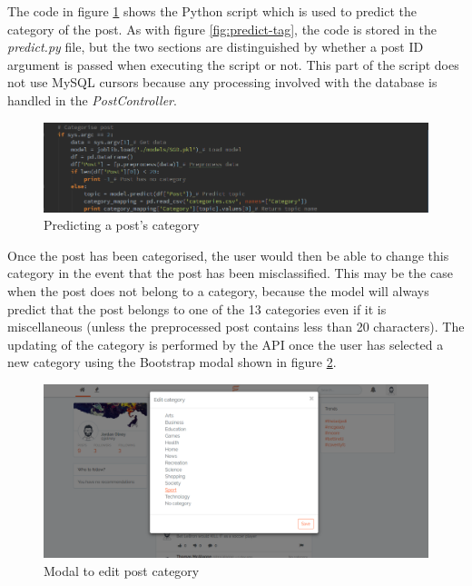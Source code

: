 The code in figure \ref{fig:predict-post} shows the Python script which is used to predict the category of the post. As with figure \ref{fig:predict-tag}, the code is stored in the \emph{predict.py} file, but the two sections are distinguished by whether a post ID argument is passed when executing the script or not. This part of the script does not use MySQL cursors because any processing involved with the database is handled in the \emph{PostController}. 

\begin{figure}[H]
\centering
\includegraphics[width=\textwidth]{Images/Implementation/predict-post}
\caption{Predicting a post's category}
\label{fig:predict-post}
\end{figure}

Once the post has been categorised, the user would then be able to change this category in the event that the post has been misclassified. This may be the case when the post does not belong to a category, because the model will always predict that the post belongs to one of the 13 categories even if it is miscellaneous (unless the preprocessed post contains less than 20 characters). The updating of the category is performed by the API once the user has selected a new category using the Bootstrap modal shown in figure \ref{fig:category-modal}. 

\begin{figure}[H]
\centering
\includegraphics[width=\textwidth]{Images/Implementation/category-modal}
\caption{Modal to edit post category}
\label{fig:category-modal}
\end{figure}

